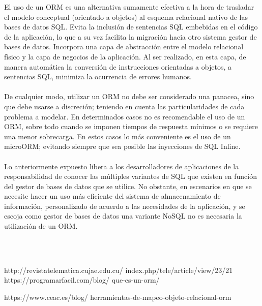 \documentclass[twoside,twocolumn]{article}
\begin{document}
\begin{flushright}
\begin{itemize}
El uso de un ORM es una alternativa sumamente efectiva a la hora de trasladar el modelo conceptual (orientado a objetos) al esquema relacional nativo de las bases de datos SQL. Evita la inclusión de sentencias SQL embebidas en el código de la aplicación, lo que a su vez facilita la migración hacia otro sistema gestor de bases de datos. Incorpora una capa de abstracción entre el modelo relacional físico y la capa de negocios de la aplicación. Al ser realizado, en esta capa, de manera automática la conversión de instrucciones orientadas a objetos, a sentencias SQL, minimiza la ocurrencia de errores humanos.\textbf{}\\
\textbf{}\\
De cualquier modo, utilizar un ORM no debe ser considerado una panacea, sino que debe usarse a discreción; teniendo en cuenta las particularidades de cada problema a modelar. En determinados casos no es recomendable el uso de un ORM, sobre todo cuando se imponen tiempos de respuesta mínimos o se requiere una menor sobrecarga. En estos casos lo más conveniente es el uso de un microORM; evitando siempre que sea posible las inyecciones de SQL Inline.\textbf{}\\
\textbf{}\\
Lo anteriormente expuesto libera a los desarrolladores de aplicaciones de la responsabilidad de conocer las múltiples variantes de SQL que existen en función del gestor de bases de datos que se utilice. No obstante, en escenarios en que se necesite hacer un uso más eficiente del sistema de almacenamiento de información, personalizado de acuerdo a las necesidades de la aplicación, y se escoja como gestor de bases de datos una variante NoSQL no es necesaria la utilización de un ORM. 



\textbf{}\\
\textbf{}\\

\begin{thebibliography}{99} %

\bibitem[]{}

\newblock 
http://revistatelematica.cujae.edu.cu/
index.php/tele/article/view/23/21
\break
https://programarfacil.com/blog/
que-es-un-orm/


https://www.ceac.es/blog/
herramientas-de-mapeo-objeto-relacional-orm



\end{thebibliography}
\end{itemize}
\end{flushright}
\end{document}
